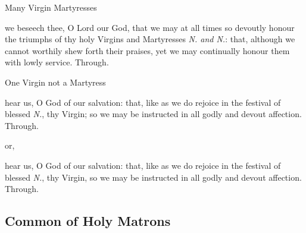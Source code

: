 \clearpage
\begin{inhead}\label{VirginMartyressesCollect}
	Many Virgin Martyresses
\end{inhead}
 we beseech thee, O Lord our God, that we may at all times so devoutly honour the triumphs of thy holy Virgins and Martyresses \textit{N. and N.}: that, although we cannot worthily shew forth their praises, yet we may continually honour them with lowly service. Through.

\begin{inhead}\label{VirginOnlyCollect}
	One Virgin not a Martyress
\end{inhead}
 hear us, O God of our salvation: that, like as we do rejoice in the festival of blessed \textit{N.}, thy Virgin; so we may be instructed in all godly and devout affection. Through.
\begin{inhead}
	or,
\end{inhead}
 hear us, O God of our salvation: that, like as we do rejoice in the festival of blessed \textit{N.}, thy Virgin, so we may be instructed in all godly and devout affection. Through.


\subsection{Common of Holy Matrons}\label{CommonHolyMatrons}

